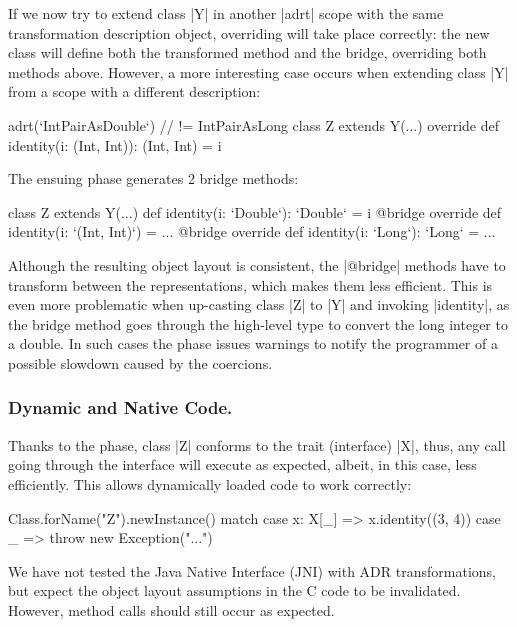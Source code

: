 If we now try to extend class |Y| in another |adrt| scope with the same transformation description object, overriding will take place correctly: the new class will define both the transformed method and the bridge, overriding both methods above. However, a more interesting case occurs when extending class |Y| from a scope with a different description:

\begin{lstlisting-nobreak}
adrt(`IntPairAsDouble`) { // != IntPairAsLong
  class Z extends Y(...) {
    override def identity(i: (Int, Int)): (Int, Int) = i
  }
}
\end{lstlisting-nobreak}

The ensuing \bridge{} phase generates 2 bridge methods:

\begin{lstlisting-nobreak}
class Z extends Y(...) {
  def identity(i: `Double`): `Double` = i
  @bridge override def identity(i: `(Int, Int)`) = ...
  @bridge override def identity(i: `Long`): `Long` = ...
}
\end{lstlisting-nobreak}

Although the resulting object layout is consistent, the |@bridge| methods have to transform between the representations, which makes them less efficient. This is even more problematic when up-casting class |Z| to |Y| and invoking |identity|, as the bridge method goes through the high-level type to convert the long integer to a double. In such cases the \bridge{} phase issues warnings to notify the programmer of a possible slowdown caused by the coercions.

\subsubsection*{Dynamic and Native Code.} Thanks to the \bridge{} phase, class |Z| conforms to the trait (interface) |X|, thus, any call going through the interface will execute as expected, albeit, in this case, less efficiently. This allows dynamically loaded code to work correctly:

\label{sec:ildl:language-dynamically-loaded-code}

\begin{lstlisting-nobreak}
Class.forName("Z").newInstance() match {
  case x: X[_] => x.identity((3, 4))
  case _ => throw new Exception("...")
}
\end{lstlisting-nobreak}

We have not tested the Java Native Interface (JNI) with ADR transformations, but expect the object layout assumptions in the C code to be invalidated. However, method calls should still occur as expected.

